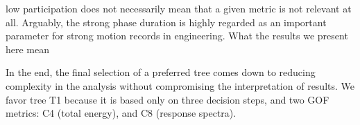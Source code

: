 
 low participation does not necessarily mean that a given metric is not relevant at all. Arguably, the strong phase duration is highly regarded as an important parameter for strong motion records in engineering. What the results we present here mean 



In the end, the final selection of a preferred tree comes down to reducing complexity in the analysis without compromising the interpretation of results. We favor tree T1 because it is based only on three decision steps, and two GOF metrics: C4 (total energy), and C8 (response spectra).




